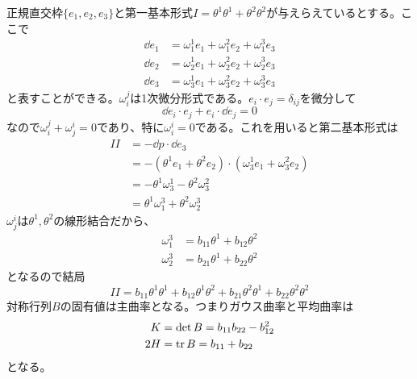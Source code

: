     正規直交枠$\{e_1, e_2, e_3\}$と第一基本形式$I = \theta^1\theta^1 + \theta^2\theta^2$が与えらえているとする。ここで
    \begin{align*}
        \dd{e_1} &= \omega^1_1e_1 + \omega^2_1e_2 + \omega^3_1e_3\\
        \dd{e_2} &= \omega^1_2e_1 + \omega^2_2e_2 + \omega^3_2e_3\\
        \dd{e_3} &= \omega^1_3e_1 + \omega^2_3e_2 + \omega^3_3e_3
    \end{align*}
    と表すことができる。$\omega_i^j$は1次微分形式である。$e_i \cdot e_j = \delta_{ij}$を微分して
        \[\dd{e_i} \cdot e_j + e_i \cdot \dd{e_j} = 0\]
    なので$\omega_i^j + \omega_j^i = 0$であり、特に$\omega_i^i = 0$である。これを用いると第二基本形式は
    \begin{align*}
        II  &= -\dd{p} \cdot \dd{e_3}\\
            &= - (\theta^1e_1 + \theta^2e_2) \cdot (\omega^1_3e_1 + \omega^2_3e_2)\\
            &= - \theta^1\omega^1_3 - \theta^2\omega^2_3\\
            &= \theta^1\omega^3_1 + \theta^2\omega^3_2
    \end{align*}
    $\omega^i_j$は$\theta^1, \theta^2$の線形結合だから、
    \begin{align*}
        \omega^3_1 &= b_{11}\theta^1 + b_{12}\theta^2\\
        \omega^3_2 &= b_{21}\theta^1 + b_{22}\theta^2
    \end{align*}
    となるので結局
        \[II = b_{11}\theta^1\theta^1 + b_{12}\theta^1\theta^2 + b_{21}\theta^2\theta^1 + b_{22}\theta^2\theta^2\]
    対称行列$B$の固有値は主曲率となる。つまりガウス曲率と平均曲率は
    \begin{align*}
        K &= \det B = b_{11}b_{22} - b_{12}^2\\
        2H &= \operatorname{tr} B = b_{11} + b_{22}
    \end{align*}
    となる。

